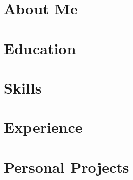 \documentclass[10pt, letterpaper]{article}
\begin{document}
    \newcommand{\AND}{\unskip
        \cleaders\copy\ANDbox\hskip\wd\ANDbox
        \ignorespaces
    }
    \newsavebox\ANDbox
    \sbox\ANDbox{$|$}
    
\vspace{7pt - 0.3cm}

\section{About Me}

\section{Education}

\section{Skills}

\section{Experience}
    
\section{Personal Projects}
\end{document}
